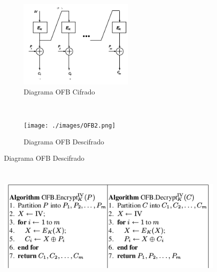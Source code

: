 \begin{figure}[h]
    \centering
    \begin{subfigure}[t]{0.5\textwidth}
        \centering
        \includegraphics[height=1.7in]{./images/ofb1.png}
		\caption{Diagrama OFB Cifrado}
		\label{fig:1-6-1}
    \end{subfigure}%
    ~ 
    \begin{subfigure}[t]{0.5\textwidth}
        \centering
        \texttt{[image: ./images/OFB2.png]}
		\caption{Diagrama OFB Descifrado}
		\label{fig:1-6-1}
    \end{subfigure}
    \label{fig:protocol}
\end{figure}

\begin{figure}[H]
\centering
	\includegraphics[width=14cm, height=6cm]{./images/pofb.png}
	
\end{figure}
\pagebreak
